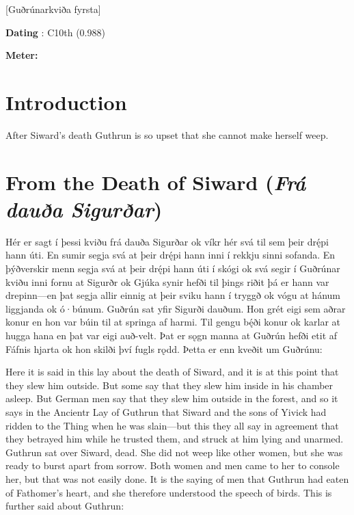[Guðrúnarkviða fyrsta]

\begin{flushright}%
\textbf{Dating} \parencite{Sapp2022}: C10th (0.988)

\textbf{Meter:} \Fornyrdislag%
\end{flushright}

\section{Introduction}

After Siward’s death Guthrun is so upset that she cannot make herself weep.

\sectionline

\section{From the Death of Siward (\emph{Frá dauða Sigurðar})}

\bpg\bpa Hér er sagt í þessi kviðu frá dauða Sigurðar ok víkr hér svá til sem þeir drę́pi hann úti. En sumir segja svá at þeir drę́pi hann inni í rekkju sinni sofanda. En þýðverskir menn segja svá at þeir drę́pi hann úti í skógi ok svá segir í Guðrúnar kviðu inni fornu at Sigurðr ok Gjúka synir hefði til þings riðit þá er hann var drepinn—en þat segja allir einnig at þeir sviku hann í tryggð ok vógu at hánum liggjanda ok ó·búnum.
Guðrún sat yfir Sigurði dauðum. Hon grét eigi sem aðrar konur en hon var búin til at springa af harmi. Til gengu bę́ði konur ok karlar at hugga hana en þat var eigi auð-velt. Þat er sǫgn manna at Guðrún hefði etit af Fáfnis hjarta ok hon skilði því fugls rǫdd. Þetta er enn kveðit um Guðrúnu:\epa

\bpb Here it is said in this lay about the death of Siward, and it is at this point that they slew him outside. But some say that they slew him inside in his chamber asleep. But German men say that they slew him outside in the forest, and so it says in the Ancientr Lay of Guthrun that Siward and the sons of Yivick had ridden to the Thing when he was slain—but this they all say in agreement that they betrayed him while he trusted them, and struck at him lying and unarmed.
Guthrun sat over Siward, dead. She did not weep like other women, but she was ready to burst apart from sorrow. Both women and men came to her to console her, but that was not easily done. It is the saying of men that Guthrun had eaten of Fathomer’s heart, and she therefore understood the speech of birds. This is further said about Guthrun:\epb\epg

